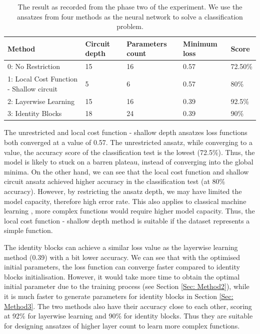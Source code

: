 \begin{table}
    \centering
    \begin{tabular}{|| p{4cm} p{2cm} p{2cm} p{2cm} p{2cm} ||}
        \hline
        \textbf{Method}                          & \textbf{Circuit depth} & \textbf{Parameters count} & \textbf{Minimum loss} & \textbf{Score} \\
        \hline \hline
        0: No Restriction                        & 15                     & 16                        & 0.57                  & 72.50\%        \\
        1: Local Cost Function - Shallow circuit & 5                      & 6                         & 0.57                  & 80\%           \\
        2: Layerwise Learning                    & 15                     & 16                        & 0.39                  & 92.5\%         \\
        3: Identity Blocks                       & 18                     & 24                        & 0.39                  & 90\%           \\
        \hline
    \end{tabular}
    \caption{
        The result as recorded from the phase two of the experiment.
        We use the ansatzes from four methods as the neural network to solve a classification problem.
    }
    \label{Tab: Experiment Phase 2 Res}
\end{table}

The unrestricted and local cost function - shallow depth ansatzes loss functions both converged at a value of 0.57.
The unrestricted ansatz, while converging to a value, the accuracy score of the classification test is the lowest (72.5\%).
Thus, the model is likely to stuck on a barren plateau, instead of converging into the global minima.
On the other hand, we can see that the local cost function and shallow circuit ansatz achieved higher accuracy in the classification test (at 80\% accuracy).
However, by restricting the ansatz depth, we may have limited the model capacity, therefore high error rate.
This also applies to classical machine learning \cite{ianDeepLearningAdaptive2016}, more complex functions would require higher model capacity. 
Thus, the local cost function - shallow depth method is suitable if the dataset represents a simple function.


The identity blocks can achieve a similar loss value as the layerwise learning method (0.39) with a bit lower accuracy.
We can see that with the optimised initial parameters, the loss function can converge faster compared to identity blocks initialisation.
However, it would take more time to obtain the optimal initial parameter due to the training process (see Section \ref{Sec: Method2}), while it is much faster to generate parameters for identity blocks in Section \ref{Sec: Method3}.
The two methods also have their accuracy close to each other, scoring at 92\% for layerwise learning and 90\% for identity blocks.
Thus they are suitable for designing ansatzes of higher layer count to learn more complex functions.


